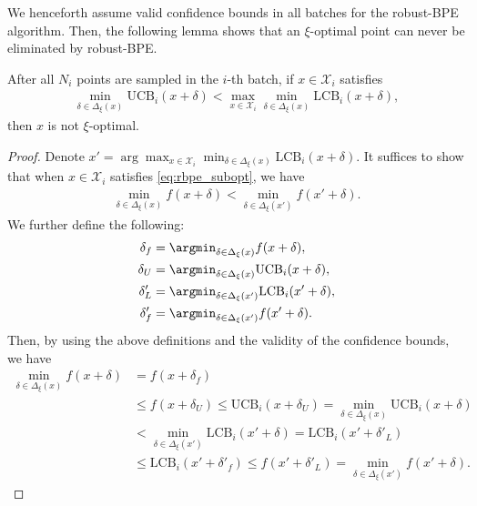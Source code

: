 \documentclass[10pt]{article}
\begin{document}
We henceforth assume valid confidence bounds in all batches for the robust-BPE algorithm.
Then, the following lemma shows that an $\xi$-optimal point can never be eliminated by robust-BPE.

\begin{lemma}
    \label{lem:aux_robust_elimination}
    After all $N_i$ points are sampled in the $i$-th batch, if $x\in\mathcal{X}_i$ satisfies
    \begin{align}
        \min_{\delta\in\Delta_{\xi}(x)} \mathrm{UCB}_i(x+\delta) 
        < \max_{x\in{\mathcal{X}_i}} \min_{\delta\in\Delta_{\xi}(x)} \mathrm{LCB}_i(x+\delta), \label{eq:rbpe_subopt}
    \end{align}
    then $x$ is not $\xi$-optimal.
\end{lemma}
\begin{proof}
    Denote $x' = \arg\max_{x\in{\mathcal{X}_i}} \min_{\delta\in\Delta_{\xi}(x)} \mathrm{LCB}_i(x+\delta) $. It suffices to show that when $x\in \mathcal{X}_i$ satisfies \eqref{eq:rbpe_subopt}, we have
    \begin{align}
        \min_{\delta\in\Delta_{\xi}(x)} f(x+\delta)
        < \min_{\delta\in\Delta_{\xi}(x')} f(x'+\delta).
    \end{align}
    We further define the following:
    \begin{align}
        \delta_f & = \argmin_{\delta\in\Delta_{\xi}(x)} f(x+\delta), \\
        \delta_U & = \argmin_{\delta\in\Delta_{\xi}(x)} \mathrm{UCB}_i(x+\delta), \\
        \delta'_L & = \argmin_{\delta\in\Delta_{\xi}(x')} \mathrm{LCB}_i(x'+\delta), \\
        \delta'_f & = \argmin_{\delta\in\Delta_{\xi}(x')} f(x'+\delta).
    \end{align}
    Then, by using the above definitions and the validity of the confidence bounds, we have
    \begin{align}
        \min_{\delta\in\Delta_{\xi}(x)} f(x+\delta) 
        & = f(x+\delta_f) \\
        & \leq f(x+\delta_U)
        \leq \mathrm{UCB}_i(x+\delta_U)
        = \min_{\delta\in\Delta_{\xi}(x)} \mathrm{UCB}_i(x+\delta) \\
        & < \min_{\delta\in\Delta_{\xi}(x')} \mathrm{LCB}_i(x'+\delta)
        = \mathrm{LCB}_i(x'+\delta'_L) \\
        & \leq \mathrm{LCB}_i(x'+\delta'_f)
        \leq f(x'+\delta'_L) = \min_{\delta\in\Delta_{\xi}(x')} f(x'+\delta).
    \end{align}
\end{proof}
\end{document}

